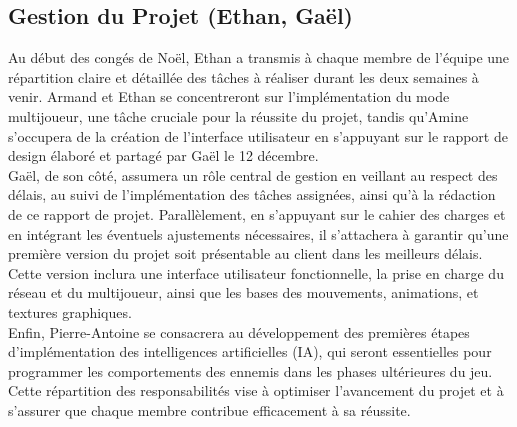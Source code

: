 \documentclass{report}
\begin{document}
\subsection*{Gestion du Projet (Ethan, Gaël)}
Au début des congés de Noël, Ethan a transmis à chaque membre de l’équipe une répartition claire et détaillée des tâches à réaliser durant les deux semaines à venir. Armand et Ethan se concentreront sur l’implémentation du mode multijoueur, une tâche cruciale pour la réussite du projet, tandis qu’Amine s’occupera de la création de l’interface utilisateur en s’appuyant sur le rapport de design élaboré et partagé par Gaël le 12 décembre.
\\[0.4cm]
Gaël, de son côté, assumera un rôle central de gestion en veillant au respect des délais, au suivi de l’implémentation des tâches assignées, ainsi qu’à la rédaction de ce rapport de projet. Parallèlement, en s’appuyant sur le cahier des charges et en intégrant les éventuels ajustements nécessaires, il s’attachera à garantir qu’une première version du projet soit présentable au client dans les meilleurs délais. Cette version inclura une interface utilisateur fonctionnelle, la prise en charge du réseau et du multijoueur, ainsi que les bases des mouvements, animations, et textures graphiques.
\\[0.4cm]
Enfin, Pierre-Antoine se consacrera au développement des premières étapes d’implémentation des intelligences artificielles (IA), qui seront essentielles pour programmer les comportements des ennemis dans les phases ultérieures du jeu. Cette répartition des responsabilités vise à optimiser l’avancement du projet et à s’assurer que chaque membre contribue efficacement à sa réussite.
\end{document}
